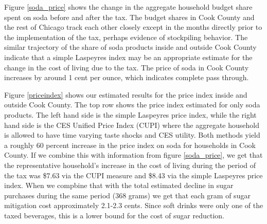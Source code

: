 \documentclass[12pt]{article}
\begin{document}
Figure \ref{soda_price} shows the change in the aggregate household budget share spent on soda before and after the tax. The budget shares in Cook County and the rest of Chicago track each other closely except in the months directly prior to the implementation of the tax, perhaps evidence of stockpiling behavior. The similar trajectory of the share of soda products inside and outside Cook County indicate that a simple Laspeyres index may be an appropriate estimate for the change in the cost of living due to the tax. The price of soda in Cook County increases by around 1 cent per ounce, which indicates complete pass through.

Figure \ref{priceindex} shows our estimated results for the price index inside and outside Cook County. The top row shows the price index estimated for only soda products. The left hand side is the simple Laspeyres price index, while the right hand side is the CES Unified Price Index (CUPI) where the aggregate household is allowed to have time varying taste shocks and CES utility. Both methods yield a roughly 60 percent increase in the price index on soda for households in Cook County. If we combine this with information from figure \ref{soda_price}, we get that the representative household's increase in the cost of living during the period of the tax was \$7.63 via the CUPI measure and \$8.43 via the simple Laspeyres price index. When we compbine that with the total estimated decline in sugar purchases during the same period (368 grams) we get that each gram of sugar mitigation cost approximately 2.1-2.3 cents. Since soft drinks were only one of the taxed beverages, this is a lower bound for the cost of sugar reduction. 
\end{document}
